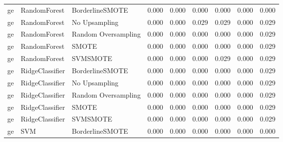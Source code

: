 \begin{tabular}{lllllllll}
      ge &                 RandomForest &     BorderlineSMOTE & 0.000 &                     0.000 &                 0.000 &                  0.000 &                                   0.000 &     0.000 \\
      ge &                 RandomForest &       No Upsampling & 0.000 &                     0.000 &                 0.029 &                  0.029 &                                   0.000 &     0.029 \\
      ge &                 RandomForest & Random Oversampling & 0.000 &                     0.000 &                 0.000 &                  0.000 &                                   0.000 &     0.029 \\
      ge &                 RandomForest &               SMOTE & 0.000 &                     0.000 &                 0.000 &                  0.000 &                                   0.000 &     0.029 \\
      ge &                 RandomForest &            SVMSMOTE & 0.000 &                     0.000 &                 0.000 &                  0.029 &                                   0.000 &     0.029 \\
      ge &              RidgeClassifier &     BorderlineSMOTE & 0.000 &                     0.000 &                 0.000 &                  0.000 &                                   0.000 &     0.029 \\
      ge &              RidgeClassifier &       No Upsampling & 0.000 &                     0.000 &                 0.000 &                  0.000 &                                   0.000 &     0.029 \\
      ge &              RidgeClassifier & Random Oversampling & 0.000 &                     0.000 &                 0.000 &                  0.000 &                                   0.000 &     0.029 \\
      ge &              RidgeClassifier &               SMOTE & 0.000 &                     0.000 &                 0.000 &                  0.000 &                                   0.000 &     0.029 \\
      ge &              RidgeClassifier &            SVMSMOTE & 0.000 &                     0.000 &                 0.000 &                  0.000 &                                   0.000 &     0.029 \\
      ge &                          SVM &     BorderlineSMOTE & 0.000 &                     0.000 &                 0.000 &                  0.000 &                                   0.000 &     0.000 \\

\end{tabular}
